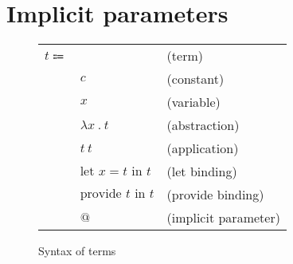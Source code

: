 \documentclass[acmlarge]{acmart}
\begin{document}
\section{Implicit parameters}

  \newcommand\entails[2]{#1 \vdash #2}
  \newcommand\hastype[2]{#1 : #2}
  \newcommand\evalsto[2]{#1 \longrightarrow #2}
  \newcommand\freevars[1]{\text{free} \left( #1 \right)}
  \newcommand\generalize[1]{\overline{\Gamma}\left( #1 \right)}
  \newcommand\sub[3]{#1 \left[ #2 \mapsto #3 \right]}

  \newcommand\labs[2]{\lambda #1 \ . \ #2}
  \newcommand\app[2]{#1 \ #2}
  \newcommand\llet[3]{\text{let } #1 = #2 \text{ in } #3}
  \newcommand\provide[2]{\text{provide } #1 \text{ in } #2}

  \newcommand\larrow[3]{#1 \Rightarrow #2 \rightarrow #3}
  \newcommand\tabs[2]{\forall #1 \ . \ #2}

  \begin{figure}[h!]
    \begin{mdframed}

      \begin{tabular}{l l l}
        $t \Coloneqq $ & & (term) \\
        & $c$ & (constant) \\
        & $x$ & (variable) \\
        & $\labs{x}{t}$ & (abstraction) \\
        & $\app{t}{t}$ & (application) \\
        & $\llet{x}{t}{t}$ & (let binding) \\
        & $\provide{t}{t}$ & (provide binding) \\
        & $@$ & (implicit parameter)
      \end{tabular}

    \end{mdframed}
    \caption{Syntax of terms}
    \label{fig:terms_syntax}
  \end{figure}
\end{document}
